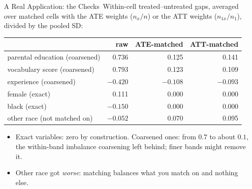 \documentclass[aspectratio=169,11pt,xcolor=dvipsnames]{beamer}
\newcommand{\core}{\,\raisebox{0.6pt}{\textcolor{corestar}{$\bigstar$}}}
\begin{document}
\begin{frame}{A Real Application: the Checks\core}
Within-cell treated--untreated gaps, averaged over matched cells with the ATE
weights ($n_x/n$) or the ATT weights ($n_{1x}/n_1$), divided by the pooled SD:
\vspace{-2pt}
\begin{center}\small
\renewcommand{\arraystretch}{1.0}
\begin{tabular}{lrrr}
\toprule
 & raw & ATE-matched & ATT-matched \\
\midrule
parental education (coarsened) & 0.736 & 0.125 & 0.141 \\
vocabulary score (coarsened)   & 0.793 & 0.123 & 0.109 \\
experience (coarsened)         & $-0.420$ & $-0.108$ & $-0.093$ \\
female (exact)                 & 0.111 & 0.000 & 0.000 \\
black (exact)                  & $-0.150$ & 0.000 & 0.000 \\
other race (not matched on)    & $-0.052$ & 0.070 & 0.095 \\
\bottomrule
\end{tabular}
\end{center}
\begin{itemize}\itemsep2pt
  \item Exact variables: zero by construction. Coarsened ones: from $0.7$ to
        about $0.1$, the within-band imbalance coarsening left behind; finer
        bands might remove it.
  \item Other race got \emph{worse}: matching balances what you match on and
        nothing else.
\end{itemize}
\end{frame}
\end{document}
